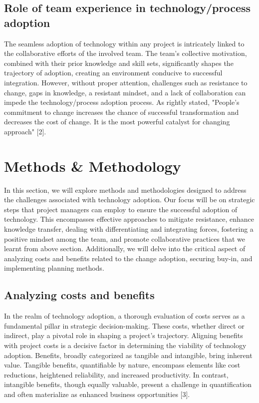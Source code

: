 \documentclass{article}
\begin{document}
\subsection{Role of team experience in technology/process adoption}

The seamless adoption of technology within any project is intricately linked to the collaborative efforts of the involved team. The team's collective motivation, combined with their prior knowledge and skill sets, significantly shapes the trajectory of adoption, creating an environment conducive to successful integration. However, without proper attention, challenges such as resistance to change, gaps in knowledge, a resistant mindset, and a lack of collaboration can impede the technology/process adoption process. As rightly stated, "People's commitment to change increases the chance of successful transformation and decreases the cost of change. It is the most powerful catalyst for changing approach" [2].


\section{Methods \& Methodology}
In this section, we will explore methods and methodologies designed to address the challenges associated with technology adoption. Our focus will be on strategic steps that project managers can employ to ensure the successful adoption of technology. This encompasses effective approaches to mitigate resistance, enhance knowledge transfer, dealing with differentiating and integrating forces, fostering a positive mindset among the team, and promote collaborative practices that we learnt from above section. Additionally, we will delve into the critical aspect of analyzing costs and benefits related to the change adoption, securing buy-in, and implementing planning methods. 


\subsection{Analyzing costs and benefits}
In the realm of technology adoption, a thorough evaluation of costs serves as a fundamental pillar in strategic decision-making. These costs, whether direct or indirect, play a pivotal role in shaping a project's trajectory. Aligning benefits with project costs is a decisive factor in determining the viability of technology adoption. Benefits, broadly categorized as tangible and intangible, bring inherent value. Tangible benefits, quantifiable by nature, encompass elements like cost reductions, heightened reliability, and increased productivity. In contrast, intangible benefits, though equally valuable, present a challenge in quantification and often materialize as enhanced business opportunities [3].
\end{document}
